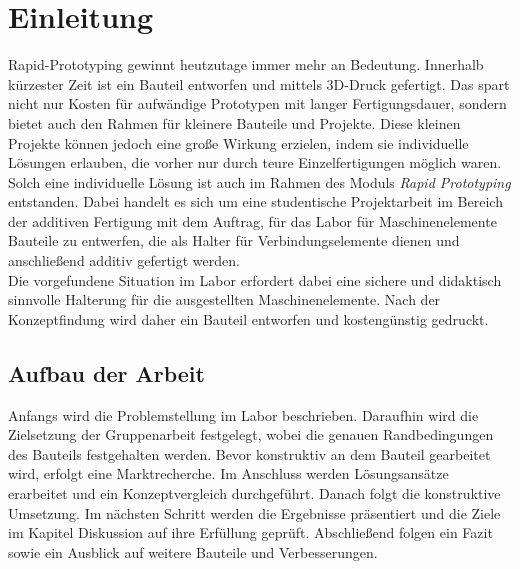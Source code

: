 \section{Einleitung}
Rapid-Prototyping gewinnt heutzutage immer mehr an Bedeutung. Innerhalb kürzester
Zeit ist ein Bauteil entworfen und mittels 3D-Druck gefertigt. Das spart nicht nur Kosten
für aufwändige Prototypen mit langer Fertigungsdauer, sondern bietet auch den Rahmen
für kleinere Bauteile und Projekte. Diese kleinen Projekte können jedoch eine große
Wirkung erzielen, indem sie individuelle Lösungen erlauben, die vorher nur durch teure
Einzelfertigungen möglich waren.\\

Solch eine individuelle Lösung ist auch im Rahmen des Moduls \textit{Rapid Prototyping}
entstanden. Dabei handelt es sich um eine studentische Projektarbeit im Bereich der
additiven Fertigung mit dem Auftrag, für das Labor für Maschinenelemente Bauteile zu
entwerfen, die als Halter für Verbindungselemente dienen und anschließend additiv
gefertigt werden.\\

 Die vorgefundene Situation im Labor erfordert dabei eine sichere und
didaktisch sinnvolle Halterung für die ausgestellten Maschinenelemente. Nach der
Konzeptfindung wird daher ein Bauteil entworfen und kostengünstig gedruckt.

\subsection{Aufbau der Arbeit}

Anfangs wird die Problemstellung im Labor beschrieben. Daraufhin wird die Zielsetzung
der Gruppenarbeit festgelegt, wobei die genauen Randbedingungen des Bauteils
festgehalten werden. Bevor konstruktiv an dem Bauteil gearbeitet wird, erfolgt eine
Marktrecherche. Im Anschluss werden Lösungsansätze erarbeitet und ein Konzeptvergleich
durchgeführt. Danach folgt die konstruktive Umsetzung. Im nächsten Schritt werden die
Ergebnisse präsentiert und die Ziele im Kapitel Diskussion auf ihre Erfüllung geprüft.
Abschließend folgen ein Fazit sowie ein Ausblick auf weitere Bauteile und Verbesserungen.